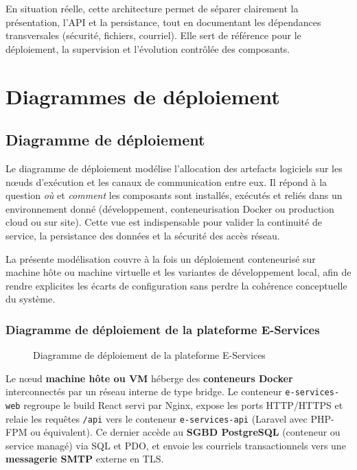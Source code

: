En situation réelle, cette architecture permet de séparer clairement la présentation, l'API et la persistance, tout en documentant les dépendances transversales (sécurité, fichiers, courriel). Elle sert de référence pour le déploiement, la supervision et l'évolution contrôlée des composants.

\vspace{0.5cm}

\newpage
\section{Diagrammes de déploiement}

\subsection{Diagramme de déploiement}

Le diagramme de déploiement modélise l'allocation des artefacts logiciels sur les nœuds d'exécution et les canaux de communication entre eux. Il répond à la question \emph{où} et \emph{comment} les composants sont installés, exécutés et reliés dans un environnement donné (développement, conteneurisation Docker ou production cloud ou sur site). Cette vue est indispensable pour valider la continuité de service, la persistance des données et la sécurité des accès réseau.

La présente modélisation couvre à la fois un déploiement conteneurisé sur machine hôte ou machine virtuelle et les variantes de développement local, afin de rendre explicites les écarts de configuration sans perdre la cohérence conceptuelle du système.

\newpage
\subsubsection{Diagramme de déploiement de la plateforme E-Services}

\begin{figure}[H]
  \centering
  
  \caption{Diagramme de déploiement de la plateforme E-Services}
  \label{fig:ddepl_plateforme}
\end{figure}

Le nœud \textbf{machine hôte ou VM} héberge des \textbf{conteneurs Docker} interconnectés par un réseau interne de type bridge. Le conteneur \texttt{e-services-web} regroupe le build React servi par Nginx, expose les ports HTTP/HTTPS et relaie les requêtes \texttt{/api} vers le conteneur \texttt{e-services-api} (Laravel avec PHP-FPM ou équivalent). Ce dernier accède au \textbf{SGBD PostgreSQL} (conteneur ou service managé) via SQL et PDO, et envoie les courriels transactionnels vers une \textbf{messagerie SMTP} externe en TLS.

